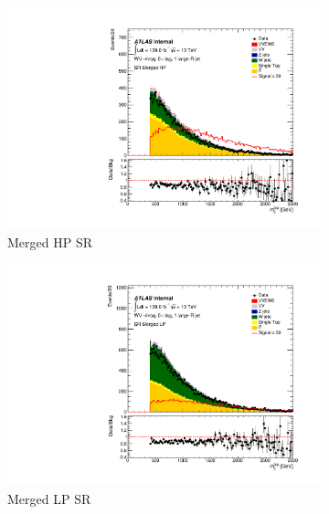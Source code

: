 \begin{figure}[ht]
    \centering
    \begin{subfigure}[b]{0.3\textwidth}
        \centering
        \includegraphics[width=\textwidth]{figures/mjjreweight1lep/SR_50/stacked_plot_merged_tagMjj.pdf}
        \caption{Merged HP SR}
        \label{fig:MC16ADE_Merged_HP_SR}
    \end{subfigure}
    \hfill
    \begin{subfigure}[b]{0.3\textwidth}
        \centering
        \includegraphics[width=\textwidth]{figures/mjjreweight1lep/SR_80/stacked_plot_merged_tagMjj.pdf}
        \caption{Merged LP SR}
        \label{fig:MC16ADE_Merged_LP_SR}
    \end{subfigure}
    \hfill
    \begin{subfigure}[b]{0.3\textwidth}

\end{subfigure}
\end{figure}
